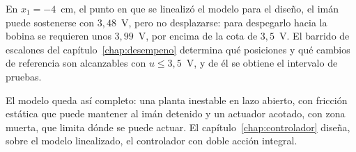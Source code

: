 En $x_1=-4$~cm, el punto en que se linealizó el modelo para el diseño, el imán puede sostenerse con $3{,}48$~V, pero no desplazarse: para despegarlo hacia la bobina se requieren unos $3{,}99$~V, por encima de la cota de $3{,}5$~V. El barrido de escalones del capítulo~\ref{chap:desempeno} determina qué posiciones y qué cambios de referencia son alcanzables con $u\le3{,}5$~V, y de él se obtiene el intervalo de pruebas.

El modelo queda así completo: una planta inestable en lazo abierto, con fricción estática que puede mantener al imán detenido y un actuador acotado, con zona muerta, que limita dónde se puede actuar. El capítulo~\ref{chap:controlador} diseña, sobre el modelo linealizado, el controlador con doble acción integral.
